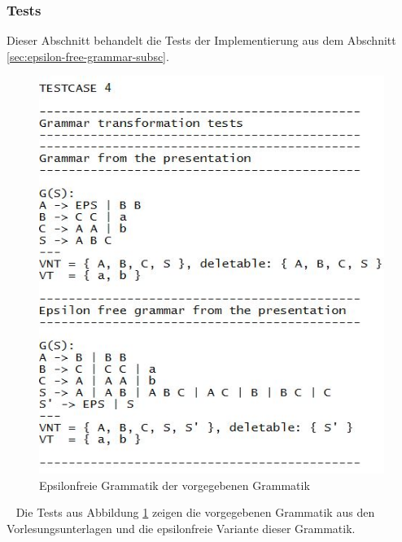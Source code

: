 \documentclass[11pt, a4paper, twoside]{article}   	%
\begin{document}
\subsubsection{Tests}
Dieser Abschnitt behandelt die Tests der Implementierung aus dem Abschnitt \ref{sec:epsilon-free-grammar-subsc}.
\begin{figure}[h]
\centering
\includegraphics[scale=0.80]{tests_epsilon_free_1.JPG}
\caption{Epsilonfreie Grammatik der vorgegebenen Grammatik}
\label{fig:hands-on-material-epsilon-free}
\end{figure}
\ \newline
Die Tests aus Abbildung \ref{fig:hands-on-material-epsilon-free} zeigen die vorgegebenen Grammatik aus den Vorlesungsunterlagen und die epsilonfreie Variante dieser Grammatik. 
\end{document}
